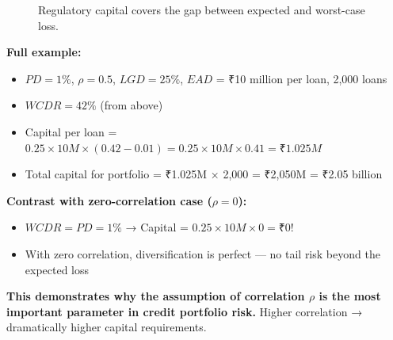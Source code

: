 \documentclass[12pt,openany]{book}
\theoremstyle{definition}
\theoremstyle{remark}
\begin{document}
\begin{figure}[H]
\centering
{}
\caption{Regulatory capital covers the gap between expected and worst-case loss.}
\end{figure}
\textbf{Full example:}

\begin{itemize}
\item $PD = 1\%$, $\rho = 0.5$, $LGD = 25\%$, $EAD$ = ₹10 million per loan, 2,000 loans


\item $WCDR = 42\%$ (from above)


\item Capital per loan = $0.25 \times 10M \times (0.42 - 0.01) = 0.25 \times 10M \times 0.41 = ₹1.025M$


\item Total capital for portfolio = ₹1.025M × 2,000 = ₹2,050M = ₹2.05 billion


\end{itemize}
\textbf{Contrast with zero-correlation case ($\rho = 0$):}

\begin{itemize}
\item $WCDR = PD = 1\%$ → Capital = $0.25 \times 10M \times 0 = ₹0$!


\item With zero correlation, diversification is perfect --- no tail risk beyond the expected loss


\end{itemize}
\textbf{This demonstrates why the assumption of correlation \(\rho\) is the most important parameter in credit portfolio risk.} Higher correlation → dramatically higher capital requirements.

\medskip
\end{document}
